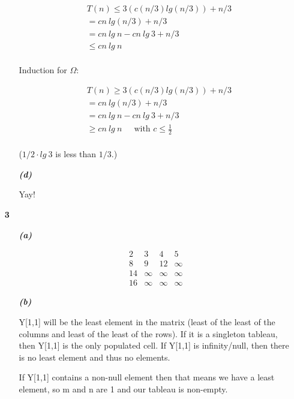 \documentclass{article}
\begin{document}
\begin{enumerate}
\begin{enumerate}
		\begin{align*}
		& T(n) \leq 3(c(n/3)lg(n/3)) + n/3 \\
		& = cn\ lg(n/3) + n/3 \\
		& = cn\ lg\ n - cn\ lg\ 3 + n/3 \\
		& \leq cn\ lg\ n  \\
		\end{align*}

		Induction for $\Omega$:

		\begin{align*}
		& T(n) \geq 3(c(n/3)lg(n/3)) + n/3 \\
		& = cn\ lg(n/3) + n/3 \\
		& = cn\ lg\ n - cn\ lg\ 3 + n/3 \\
		& \geq cn\ lg\ n \ \ \ \ \ \text{ with $c \leq \frac{1}{2}$}\\
		\end{align*}

		($1/2 \cdot lg\ 3$  is less than $1/3$.)

		\item[\textbf{\emph{{(d)}}}]

		Yay!

	\end{enumerate}

\item[\textbf{3}]

	\begin{enumerate}

		\item[\textbf{\emph{{(a)}}}]

		\[ \begin{matrix}
		2 & 3 & 4 & 5\\
		8 & 9 & 12 & \infty \\
		14 & \infty & \infty & \infty  \\
		16 & \infty & \infty & \infty 
		\end{matrix} \]

		\item[\textbf{\emph{{(b)}}}]

		Y[1,1] will be the least element in the matrix (least of the least of the
		columns and least of the least of the rows). If it is a singleton tableau,
		then Y[1,1] is the only populated cell. If Y[1,1] is infinity/null, then
		there is no least element and thus no elements.

		If Y[1,1] contains a non-null element then that means we have a least
		element, so m and n are 1 and our tableau is non-empty.


\end{enumerate}
\end{enumerate}
\end{document}
